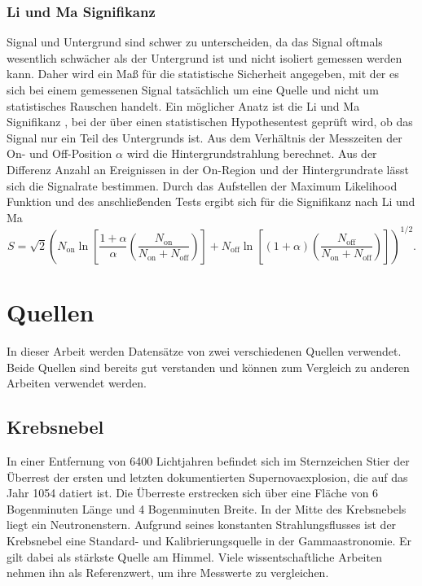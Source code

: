 \subsection*{Li und Ma Signifikanz}
Signal und Untergrund sind schwer zu unterscheiden, da das Signal oftmals wesentlich schwächer als der Untergrund ist und nicht isoliert gemessen werden kann. 
Daher wird ein Maß für die statistische Sicherheit angegeben, mit der es sich bei einem gemessenen Signal tatsächlich um eine Quelle und nicht um statistisches Rauschen handelt.
Ein möglicher Anatz ist die Li und Ma Signifikanz \cite{liandma}, bei der über einen statistischen Hypothesentest geprüft wird, ob das Signal nur ein Teil des Untergrunds ist. 
Aus dem Verhältnis der Messzeiten der On- und Off-Position $\alpha$ wird die Hintergrundstrahlung berechnet. 
Aus der Differenz Anzahl an Ereignissen in der On-Region und der Hintergrundrate lässt sich die Signalrate bestimmen. 
Durch das Aufstellen der Maximum Likelihood Funktion und des anschließenden Tests ergibt sich für die Signifikanz nach Li und Ma
\begin{equation}
S = \sqrt{2} \left( N_\text{on} \ln \left[ \frac{1+ \alpha}{\alpha}\left( \frac{N_\text{on}}{N_\text{on} + N_\text{off}} \right) \right] + N_\text{off} \ln \left[ \left( 1+ \alpha \right) \left( \frac{N_\text{off}}{N_\text{on} + N_\text{off}} \right) \right] \right)^{1/2}.
\end{equation}

\chapter{Quellen}
In dieser Arbeit werden Datensätze von zwei verschiedenen Quellen verwendet. 
Beide Quellen sind bereits gut verstanden und können zum Vergleich zu anderen Arbeiten verwendet werden.
\section{Krebsnebel}
In einer Entfernung von 6400 Lichtjahren befindet sich im Sternzeichen Stier der Überrest der ersten und letzten dokumentierten Supernovaexplosion, die auf das Jahr 1054 datiert ist. 
Die Überreste erstrecken sich über eine Fläche von 6 Bogenminuten Länge und 4 Bogenminuten Breite. 
In der Mitte des Krebsnebels liegt ein Neutronenstern.
Aufgrund seines konstanten Strahlungsflusses ist der Krebsnebel eine Standard- und Kalibrierungsquelle in der Gammaastronomie.
Er gilt dabei als stärkste Quelle am Himmel. 
Viele wissentschaftliche Arbeiten nehmen ihn als Referenzwert, um ihre Messwerte zu vergleichen. 

